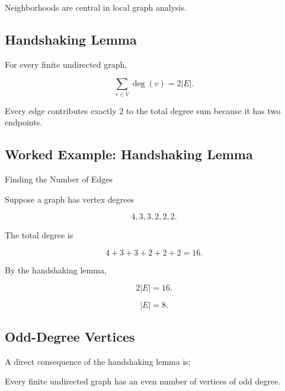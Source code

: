 Neighborhoods are central in local graph analysis.

\subsection{Handshaking Lemma}
\label{subsec:handshaking-lemma}

\begin{theorem}
For every finite undirected graph,

\[
\boxed{
\sum_{v\in V}\deg(v)
=
2|E|.
}
\]
\end{theorem}

Every edge contributes exactly \(2\) to the total degree sum because it
has two endpoints.

\subsection{Worked Example: Handshaking Lemma}
\label{subsec:worked-handshaking-lemma}

\begin{workedexamplebox}{Finding the Number of Edges}

Suppose a graph has vertex degrees

\[
4,3,3,2,2,2.
\]

The total degree is

\[
4+3+3+2+2+2=16.
\]

By the handshaking lemma,

\[
2|E|=16.
\]

\begin{answerbox}
\[
\boxed{
|E|=8.
}
\]
\end{answerbox}

\end{workedexamplebox}

\subsection{Odd-Degree Vertices}
\label{subsec:odd-degree-vertices}

A direct consequence of the handshaking lemma is:

\begin{theorem}
Every finite undirected graph has an even number of vertices of odd
degree.
\end{theorem}

